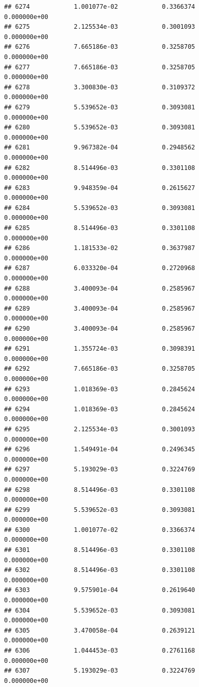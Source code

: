 \documentclass[
]{article}
\begin{document}
\begin{verbatim}
## 6274            1.001077e-02            0.3366374            0.000000e+00
## 6275            2.125534e-03            0.3001093            0.000000e+00
## 6276            7.665186e-03            0.3258705            0.000000e+00
## 6277            7.665186e-03            0.3258705            0.000000e+00
## 6278            3.300830e-03            0.3109372            0.000000e+00
## 6279            5.539652e-03            0.3093081            0.000000e+00
## 6280            5.539652e-03            0.3093081            0.000000e+00
## 6281            9.967382e-04            0.2948562            0.000000e+00
## 6282            8.514496e-03            0.3301108            0.000000e+00
## 6283            9.948359e-04            0.2615627            0.000000e+00
## 6284            5.539652e-03            0.3093081            0.000000e+00
## 6285            8.514496e-03            0.3301108            0.000000e+00
## 6286            1.181533e-02            0.3637987            0.000000e+00
## 6287            6.033320e-04            0.2720968            0.000000e+00
## 6288            3.400093e-04            0.2585967            0.000000e+00
## 6289            3.400093e-04            0.2585967            0.000000e+00
## 6290            3.400093e-04            0.2585967            0.000000e+00
## 6291            1.355724e-03            0.3098391            0.000000e+00
## 6292            7.665186e-03            0.3258705            0.000000e+00
## 6293            1.018369e-03            0.2845624            0.000000e+00
## 6294            1.018369e-03            0.2845624            0.000000e+00
## 6295            2.125534e-03            0.3001093            0.000000e+00
## 6296            1.549491e-04            0.2496345            0.000000e+00
## 6297            5.193029e-03            0.3224769            0.000000e+00
## 6298            8.514496e-03            0.3301108            0.000000e+00
## 6299            5.539652e-03            0.3093081            0.000000e+00
## 6300            1.001077e-02            0.3366374            0.000000e+00
## 6301            8.514496e-03            0.3301108            0.000000e+00
## 6302            8.514496e-03            0.3301108            0.000000e+00
## 6303            9.575901e-04            0.2619640            0.000000e+00
## 6304            5.539652e-03            0.3093081            0.000000e+00
## 6305            3.470058e-04            0.2639121            0.000000e+00
## 6306            1.044453e-03            0.2761168            0.000000e+00
## 6307            5.193029e-03            0.3224769            0.000000e+00

\end{verbatim}
\end{document}
